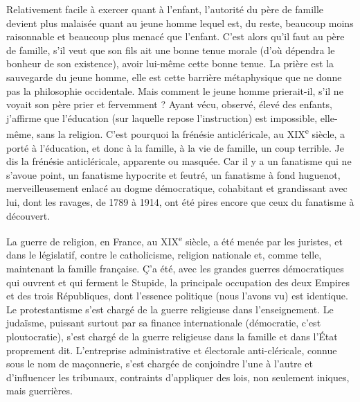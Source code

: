 \documentclass[french,twoside]{book} %
\begin{document}
Relativement facile à exercer quant à l’enfant, l’autorité du père de famille devient plus malaisée quant au jeune homme lequel est, du reste, beaucoup moins raisonnable et beaucoup plus menacé que l’enfant. C’est alors qu’il faut au père de famille, s’il veut que son fils ait une bonne tenue morale (d’où dépendra le bonheur de son existence), avoir lui-même cette bonne tenue. La prière est la sauvegarde du jeune homme, elle est cette barrière métaphysique que ne donne pas la philosophie occidentale. Mais comment le jeune homme prierait-il, s’il ne voyait son père prier et fervemment ? Ayant vécu, observé, élevé des enfants, j’affirme que l’éducation (sur laquelle repose l’instruction) est impossible, elle-même, sans la religion. C’est pourquoi la frénésie anticléricale, au XIX\textsuperscript{e} siècle, a porté à l’éducation, et donc à la famille, à la vie de famille, un coup terrible. Je dis la frénésie anticléricale, apparente ou masquée. Car il y a un fanatisme qui ne s’avoue point, un fanatisme hypocrite et feutré, un fanatisme à fond huguenot, merveilleusement enlacé au dogme démocratique, cohabitant et grandissant avec lui, dont les ravages, de 1789 à 1914, ont été pires encore que ceux du fanatisme à découvert.\par
La guerre de religion, en France, au XIX\textsuperscript{e} siècle, a été menée par les juristes, et dans le législatif, contre le catholicisme, religion nationale et, comme telle, maintenant la famille française. Ç’a été, avec les grandes guerres démocratiques qui ouvrent et qui ferment le Stupide, la principale occupation des deux Empires et des trois Républiques, dont l’essence politique (nous l’avons vu) est identique. Le protestantisme s’est chargé de la guerre religieuse dans l’enseignement. Le judaïsme, puissant surtout par sa finance internationale (démocratie, c’est ploutocratie), s’est chargé de la guerre religieuse dans la famille et dans l’État proprement dit. L’entreprise administrative et électorale anti-cléricale, connue sous le nom de maçonnerie, s’est chargée de conjoindre l’une à l’autre et d’influencer les tribunaux, contraints d’appliquer des lois, non seulement iniques, mais guerrières.\par
\end{document}
